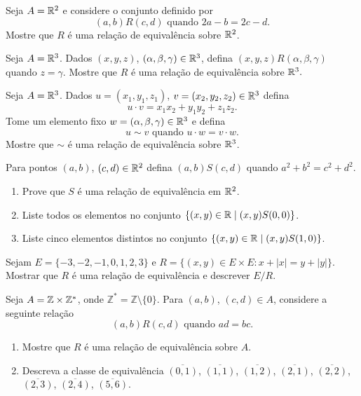 \documentclass[12pt]{exam}
\begin{document}
    \questao{} Seja $A = \mathbb{R}^2$ e considere o conjunto definido por
    \[
      (a,b)R(c,d) \mbox{ quando } 2a - b = 2c - d.
    \]
    Mostre que $R$ \'e uma rela\c{c}\~ao de equival\^encia sobre $\mathbb{R}^2$.

    \vspace{.3cm}

    \questao{} Seja $A = \mathbb{R}^3$. Dados $(x, y, z)$, $(\alpha, \beta, \gamma) \in \mathbb{R}^3$, defina $(x, y, z) R (\alpha, \beta, \gamma)$ quando $z = \gamma$. Mostre que $R$ \'e uma rela\c{c}\~ao de equival\^encia sobre $\mathbb{R}^3.$

    \vspace{.3cm}

    \questao{} Seja $A = \mathbb{R}^3$. Dados $u = (x_1, y_1, z_1)$, $v = (x_2, y_2, z_2) \in \mathbb{R}^3$ defina
    \[
        u\cdot v = x_1x_2 + y_1y_2 + z_1z_2.
    \]
    Tome um elemento fixo $w = (\alpha, \beta, \gamma) \in \mathbb{R}^3$ e defina
    \[
        u \sim v \mbox{ quando } u \cdot w = v \cdot w.
    \]
    Mostre que $\sim$ \'e uma rela\c{c}\~ao de equival\^encia sobre $\mathbb{R}^3$.

    \vspace{.3cm}

    \questao{} Para pontos $(a, b)$, $(c, d) \in \mathbb{R}^2$ defina $(a, b) S (c, d)$ quando $a^2 + b^2 = c^2 + d^2$.
    \begin{enumerate}[label={\alph*})]
      \item Prove que $S$ \'e uma rela\c{c}\~ao de equival\^encia em $\mathbb{R}^2$.
      \item Liste todos os elementos no conjunto $\{(x, y) \in \mathbb{R} \mid (x, y) S (0, 0)\}$.
      \item Liste cinco elementos distintos no conjunto $\{(x, y) \in \mathbb{R} \mid (x, y) S (1, 0)\}$.
    \end{enumerate}

    \vspace{.3cm}

    \questao{} Sejam $E = \{-3, -2, -1, 0, 1, 2, 3\}$ e $R = \{(x, y) \in E \times E : x + |x| = y + |y|\}$. Mostrar que $R$ \'e uma rela\c{c}\~ao de equival\^encia e descrever $E/R$.

    \vspace{.3cm}

    \questao{} Seja $A = \mathbb{Z} \times \mathbb{Z}^*$, onde $\mathbb{Z}^* = \mathbb{Z} \setminus \{0\}$. Para $(a,b)$, $(c,d) \in A$, considere a seguinte rela{\c c}{\~a}o
    \[
        (a,b) R (c,d) \mbox{ quando } ad = bc.
    \]
    \begin{enumerate}[label={\alph*})]
        \item Mostre que $R$ {\'e} uma rela{\c c}{\~a}o de equival{\^e}ncia sobre $A$.
        \item Descreva a classe de equival{\^e}ncia $\overline{(0,1)}$, $\overline{(1,1)}$, $\overline{(1,2)}$, $\overline{(2,1)}$, $\overline{(2,2)}$, $\overline{(2,3)}$, $\overline{(2,4)}$, $\overline{(5,6)}$.
    \end{enumerate}
\end{document}
